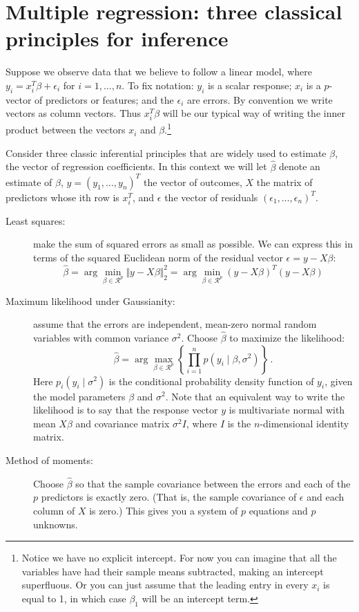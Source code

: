 \documentclass[11pt]{article}
\begin{document}
\section{Multiple regression: three classical principles for inference}

Suppose we observe data that we believe to follow a linear model, where $y_i = x_i^T \beta + \epsilon_i$ for $i = 1, \ldots, n$.
To fix notation: $y_i$ is a scalar response; $x_i$ is a $p$-vector of predictors or features; and the $\epsilon_i$ are errors.  By convention we write vectors as column vectors.  Thus $x_i^T \beta$ will be our typical way of writing the inner product between the vectors $x_i$ and $\beta$.\footnote{Notice we have no explicit intercept.  For now you can imagine that all the variables have had their sample means subtracted, making an intercept superfluous.  Or you can just assume that the leading entry in every $x_i$ is equal to 1, in which case $\beta_1$ will be an intercept term.}

Consider three classic inferential principles that are widely used to estimate $\beta$, the vector of regression coefficients.  In this context we will let $\hat{\beta}$ denote an estimate of $\beta$, $y = (y_1, \ldots, y_n)^T$ the vector of outcomes, $X$ the matrix of predictors whose ith row is $x_i^T$, and $\epsilon$ the vector of residuals $(\epsilon_1, \ldots, \epsilon_n)^T$.  
 
\begin{description}
\item[Least squares:] make the sum of squared errors as small as possible.  We can express this in terms of the squared Euclidean norm of the residual vector $\epsilon = y - X \beta$:  
$$
\hat{\beta} = \arg \min_{\beta \in \mathcal{R}^p} \Vert y - X\beta \Vert_2^2 =  \arg \min_{\beta \in \mathcal{R}^p} (y - X\beta)^T (y-X \beta)
$$
\item[Maximum likelihood under Gaussianity:] assume that the errors are independent, mean-zero normal random variables with common variance $\sigma^2$.  Choose $\hat{\beta}$ to maximize the likelihood:
$$
\hat{\beta} = \arg \max_{\beta \in \mathcal{R}^p} \left\{ \prod_{i=1}^n p(y_i \mid \beta, \sigma^2) \right\} \, .
$$
Here $p_i(y_i \mid \sigma^2)$ is the conditional probability density function of $y_i$, given the model parameters $\beta$ and $\sigma^2$.  Note that an equivalent way to write the likelihood is to say that the response vector $y$ is multivariate normal with mean $X \beta$ and covariance matrix $\sigma^2 I$, where $I$ is the $n$-dimensional identity matrix.  

\item[Method of moments:] Choose $\hat{\beta}$ so that the sample covariance between the errors and each of the $p$ predictors is exactly zero.  (That is, the sample covariance of $\epsilon$ and each column of $X$ is zero.)  This gives you a system of $p$ equations and $p$ unknowns.
\end{description}
\end{document}
